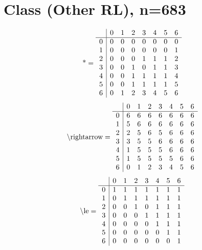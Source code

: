\documentclass[11pt]{article}
\begin{document}
\section{Class (Other RL), n=683}
\[\text{*} = 
\begin{array}{r | r r r r r r r}
 & 0 & 1 & 2 & 3 & 4 & 5 & 6 \\ \hline
0 & 0 & 0 & 0 & 0 & 0 & 0 & 0 \\
1 & 0 & 0 & 0 & 0 & 0 & 0 & 1 \\
2 & 0 & 0 & 0 & 1 & 1 & 1 & 2 \\
3 & 0 & 0 & 1 & 0 & 1 & 1 & 3 \\
4 & 0 & 0 & 1 & 1 & 1 & 1 & 4 \\
5 & 0 & 0 & 1 & 1 & 1 & 1 & 5 \\
6 & 0 & 1 & 2 & 3 & 4 & 5 & 6 \\
\end{array}
\]
\[\text{\textbackslash rightarrow} = 
\begin{array}{r | r r r r r r r}
 & 0 & 1 & 2 & 3 & 4 & 5 & 6 \\ \hline
0 & 6 & 6 & 6 & 6 & 6 & 6 & 6 \\
1 & 5 & 6 & 6 & 6 & 6 & 6 & 6 \\
2 & 2 & 5 & 6 & 5 & 6 & 6 & 6 \\
3 & 3 & 5 & 5 & 6 & 6 & 6 & 6 \\
4 & 1 & 5 & 5 & 5 & 6 & 6 & 6 \\
5 & 1 & 5 & 5 & 5 & 5 & 6 & 6 \\
6 & 0 & 1 & 2 & 3 & 4 & 5 & 6 \\
\end{array}
\]
\[\text{\textbackslash le} = 
\begin{array}{r | r r r r r r r}
 & 0 & 1 & 2 & 3 & 4 & 5 & 6 \\ \hline
0 & 1 & 1 & 1 & 1 & 1 & 1 & 1 \\
1 & 0 & 1 & 1 & 1 & 1 & 1 & 1 \\
2 & 0 & 0 & 1 & 0 & 1 & 1 & 1 \\
3 & 0 & 0 & 0 & 1 & 1 & 1 & 1 \\
4 & 0 & 0 & 0 & 0 & 1 & 1 & 1 \\
5 & 0 & 0 & 0 & 0 & 0 & 1 & 1 \\
6 & 0 & 0 & 0 & 0 & 0 & 0 & 1 \\
\end{array}
\]
\end{document}
